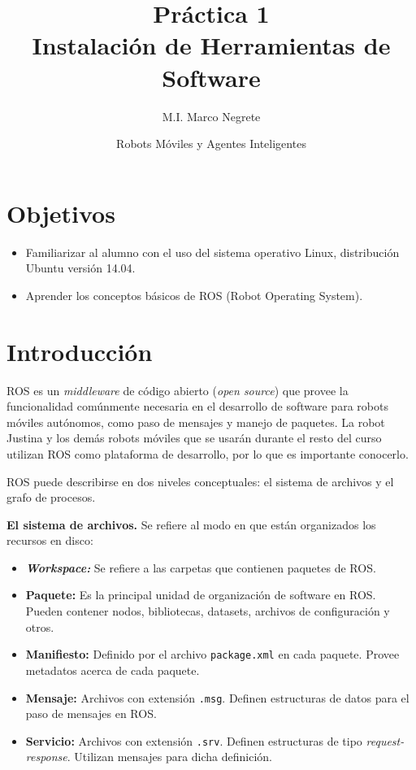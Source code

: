 \documentclass[letterpaper,12pt]{article}
\title{Práctica 1 \\ Instalación de Herramientas de Software}
\author{M.I. Marco Negrete}
\date{Robots Móviles y Agentes Inteligentes}
\begin{document}
\renewcommand{\tablename}{Tabla}
\maketitle
\section*{Objetivos}
\begin{itemize}
\item Familiarizar al alumno con el uso del sistema operativo Linux, distribución Ubuntu versión 14.04.
\item Aprender los conceptos básicos de ROS (Robot Operating System).
\end{itemize}

\section{Introducción}
ROS es un \textit{middleware} de código abierto (\textit{open source}) que provee la funcionalidad comúnmente necesaria en el desarrollo de software para robots móviles autónomos, como paso de mensajes y manejo de paquetes. La robot Justina y los demás robots móviles que se usarán durante el resto del curso utilizan ROS como plataforma de desarrollo, por lo que es importante conocerlo.

ROS puede describirse en dos niveles conceptuales: el sistema de archivos y el grafo de procesos.

\textbf{El sistema de archivos.} Se refiere al modo en que están organizados los recursos en disco:
\begin{itemize}
\item \textbf{\textit{Workspace:}} Se refiere a las carpetas que contienen paquetes de ROS.
\item \textbf{Paquete:} Es la principal unidad de organización de software en ROS. Pueden contener nodos, bibliotecas, datasets, archivos de configuración y otros.
\item \textbf{Manifiesto:} Definido por el archivo \texttt{package.xml} en cada paquete. Provee metadatos acerca de cada paquete. 
\item \textbf{Mensaje:} Archivos con extensión \texttt{.msg}. Definen estructuras de datos para el paso de mensajes en ROS.
\item \textbf{Servicio:} Archivos con extensión \texttt{.srv}. Definen estructuras de tipo \textit{request-response}. Utilizan mensajes para dicha definición.
\end{itemize}
\end{document}
